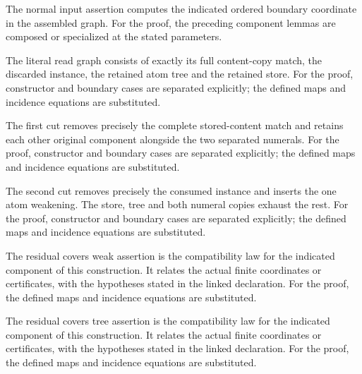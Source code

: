 The normal input assertion computes the indicated ordered boundary coordinate in the assembled graph.
For the proof, the preceding component lemmas are composed or specialized at the stated parameters.
\par{}

The literal read graph consists of exactly its full content-copy match, the discarded instance, the retained atom tree and the retained store.
For the proof, constructor and boundary cases are separated explicitly; the defined maps and incidence equations are substituted.
\par{}

The first cut removes precisely the complete stored-content match and retains each other original component alongside the two separated numerals.
For the proof, constructor and boundary cases are separated explicitly; the defined maps and incidence equations are substituted.
\par{}

The second cut removes precisely the consumed instance and inserts the one atom weakening. The store, tree and both numeral copies exhaust the rest.
For the proof, constructor and boundary cases are separated explicitly; the defined maps and incidence equations are substituted.
\par{}

The residual covers weak assertion is the compatibility law for the indicated component of this construction. It relates the actual finite coordinates or certificates, with the hypotheses stated in the linked declaration.
For the proof, the defined maps and incidence equations are substituted.
\par{}

The residual covers tree assertion is the compatibility law for the indicated component of this construction. It relates the actual finite coordinates or certificates, with the hypotheses stated in the linked declaration.
For the proof, the defined maps and incidence equations are substituted.
\par{}

